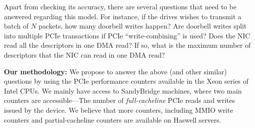 Apart from checking its accuracy, there are several questions that need to
be answered regarding this model. For instance, if the drives wishes to transmit a batch
of $N$ packets, how many doorbell writes happen?  Are doorbell writes split into
multiple PCIe transactions if PCIe ``write-combining'' is used? Does the NIC read
all the descriptors in one DMA read?  If so, what is the maximum number of descriptors
that the NIC can read in one DMA read?

\textbf{Our methodology:} We propose to answer the above (and other similar)
questions by using the PCIe performance counters available in the Xeon series of
Intel CPUs.  We mainly have access to SandyBridge machines, where two main counters
are accessible---The number of \emph{full-cacheline} PCIe reads and writes issued
by the device.  We believe that more counters, including MMIO write counters
and partial-cacheline counters are available on Haswell servers.



